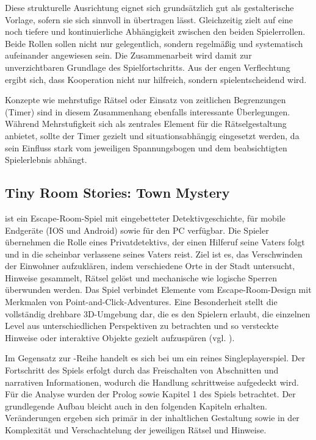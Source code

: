 Diese strukturelle Ausrichtung eignet sich grundsätzlich gut als gestalterische Vorlage, sofern sie sich sinnvoll in  übertragen lässt. Gleichzeitig zielt  auf eine noch tiefere und kontinuierliche Abhängigkeit zwischen den beiden Spielerrollen. Beide Rollen sollen nicht nur gelegentlich, sondern regelmäßig und systematisch aufeinander angewiesen sein. Die Zusammenarbeit wird damit zur unverzichtbaren Grundlage des Spielfortschritts. Aus der engen Verflechtung ergibt sich, dass Kooperation nicht nur hilfreich, sondern spielentscheidend wird.

Konzepte wie mehrstufige Rätsel oder Einsatz von zeitlichen Begrenzungen (Timer) sind in diesem Zusammenhang ebenfalls interessante Überlegungen. Während Mehrstufigkeit sich als zentrales Element für die Rätselgestaltung anbietet, sollte der Timer gezielt und situationsabhängig eingesetzt werden, da sein Einfluss stark vom jeweiligen Spannungsbogen und dem beabsichtigten Spielerlebnis abhängt.

\subsection{Tiny Room Stories: Town Mystery}
 ist ein Escape-Room-Spiel mit eingebetteter Detektivgeschichte, für mobile Endgeräte (IOS und Android) sowie für den PC verfügbar. Die Spieler übernehmen die Rolle eines Privatdetektivs, der einen Hilferuf seine Vaters folgt und in die scheinbar verlassene seines Vaters reist. Ziel ist es, das Verschwinden der Einwohner aufzuklären, indem verschiedene Orte in der Stadt untersucht, Hinweise gesammelt, Rätsel gelöst und mechanische wie logische Sperren überwunden werden. 
Das Spiel verbindet Elemente vom Escape-Room-Design mit Merkmalen von Point-and-Click-Adventures. Eine Besonderheit stellt die vollständig drehbare \ac{3D}-Umgebung dar, die es den Spielern erlaubt, die einzelnen Level aus unterschiedlichen Perspektiven zu betrachten und so versteckte Hinweise oder interaktive Objekte gezielt aufzuspüren (vgl. \citealp{kiary_games_tiny_2021}).

Im Gegensatz zur -Reihe handelt es sich bei  um ein reines Singleplayerspiel. Der Fortschritt des Spiels erfolgt durch das Freischalten von Abschnitten und narrativen Informationen, wodurch die Handlung schrittweise aufgedeckt wird. Für die Analyse wurden der Prolog sowie Kapitel 1 des Spiels betrachtet. Der grundlegende Aufbau bleicht auch in den folgenden Kapiteln erhalten. Veränderungen ergeben sich primär in der inhaltlichen Gestaltung sowie in der Komplexität und Verschachtelung der jeweiligen Rätsel und Hinweise.

